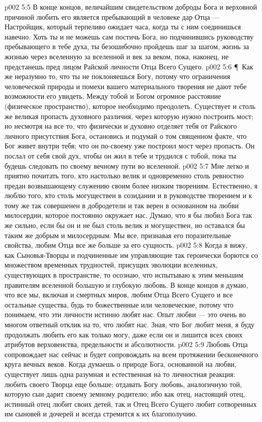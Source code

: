 \vs p002 5:5 В конце концов, величайшим свидетельством доброды Бога и верховной причиной любить его является пребывающий в человеке дар Отца --- Настройщик, который терпеливо ожидает часа, когда ты с ним соединишься навечно. Хоть ты и не можешь сам постичь Бога, но подчинившись руководству пребывающего в тебе духа, ты безошибочно пройдешь шаг за шагом, жизнь за жизнью через вселенную за вселенной и век за веком, пока, наконец, не предстанешь пред лицом Райской личности Отца Всего Сущего.
\vs p002 5:6 \P\ Как же неразумно то, что ты не поклоняешься Богу, потому что ограничения человеческой природы и помехи вашего материального творения не дают тебе возможности его увидеть. Между тобой и Богом огромное расстояние (физическое пространство), которое необходимо преодолеть. Существует и столь же великая пропасть духовного различия, через которую нужно построить мост; но несмотря на все то, что физически и духовно отделяет тебя от Райского личного присутствия Бога, остановись и подумай о том священном факте, что Бог живет внутри тебя; что он по\hyp{}своему уже построил мост через пропасть. Он послал от себя свой дух, чтобы он жил в тебе и трудился с тобой, пока ты будешь следовать по своему вечному пути во вселенной.
\vs p002 5:7 Мне легко и приятно почитать того, кто настолько велик и одновременно столь ревностно предан возвышающему служению своим более низким творениям. Естественно, я люблю того, кто столь могуществен в созидании и в руководстве творением и к тому же так совершенен в добродетели и так верен в основанном на любви милосердии, которое постоянно окружает нас. Думаю, что я бы любил Бога так же сильно, если бы он и не был столь велик и могуществен, но оставался бы таким же добрым и милосердным. Мы все, признавая его поразительные свойства, любим Отца все же больше за его сущность.
\vs p002 5:8 Когда я вижу, как Сыновья\hyp{}Творцы и подчиненные им управляющие так героически борются со множеством временных трудностей, присущих эволюции вселенных, существующих в пространстве, то осознаю, что испытываю к этим меньшим правителям вселенной большую и глубокую любовь. В конце концов я думаю, что все мы, включая и смертных миров, любим Отца Всего Сущего и все остальные существа, будь то божественные или человеческие, потому что понимаем, что эти личности истинно любят нас. Опыт любви --- это очень во многом ответный отклик на то, что любят нас. Зная, что Бог любит меня, я буду продолжать любить его как только могу, даже если он и лишится всех своих атрибутов верховенства, предельности и абсолютности.
\vs p002 5:9 Любовь Отца сопровождает нас сейчас и будет сопровождать на всем протяжении бесконечного круга вечных веков. Когда думаешь о природе Бога, основанной на любви, существует лишь одна разумная и естественная на то личностная реакция: любить своего Творца еще больше; отдавать Богу любовь, аналогичную той, которую сын дарит своему земному родителю; ибо как отец, настоящий отец, истинный отец любит своих детей, так и Отец Всего Сущего любит сотворенных им сыновей и дочерей и всегда стремится к их благополучию.
